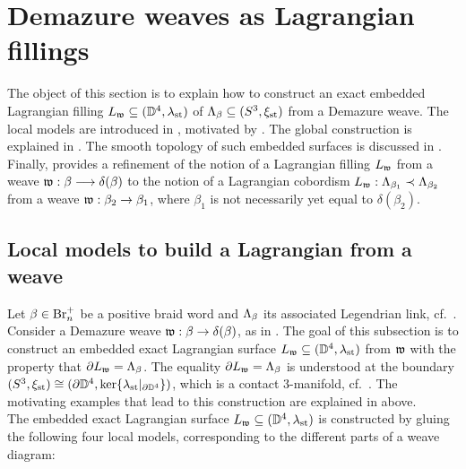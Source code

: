 \section{Demazure weaves as Lagrangian fillings}\label{sec:weaves_Lagrangian_fillings}

The object of this section is to explain how to construct an exact embedded Lagrangian filling $L_{\mathfrak{w}}\subseteq(\mathbb{D}^4,\lambda_{\text{st}})$ of $\Lambda_\beta\subseteq(S^3,\xi_{\text{st}})$ from a Demazure weave. The local models are introduced in , motivated by . The global construction is explained in . The smooth topology of such embedded surfaces is discussed in . Finally,  provides a refinement of the notion of a Lagrangian filling $L_{\mathfrak{w}}$ from a weave $\mathfrak{w}:\beta\longrightarrow\delta(\beta)$ to the notion of a Lagrangian cobordism $L_{\mathfrak{w}}:\Lambda_{\beta_1}\prec\Lambda_{\beta_2}$ from a weave $\mathfrak{w}:\beta_2\to\beta_1$, where $\beta_1$ is not necessarily yet equal to $\delta(\beta_2)$.

\subsection{Local models to build a Lagrangian from a weave}\label{ssec:Lagrangian_filling_from_weave_local_models} Let $\beta\in\mbox{Br}_n^+$ be a positive braid word and $\Lambda_\beta$ its associated Legendrian link, cf.~. Consider a Demazure weave $\mathfrak{w}:\beta\to\delta(\beta)$, as in . The goal of this subsection is to construct an embedded exact Lagrangian surface $L_{\mathfrak{w}}\subseteq(\mathbb{D}^4,\lambda_{\text{st}})$ from $\mathfrak{w}$ with the property that $\partial L_{\mathfrak{w}}=\Lambda_\beta$. The equality $\partial L_{\mathfrak{w}}=\Lambda_\beta$ is understood at the boundary $(S^3,\xi_{\text{st}})\cong (\partial \mathbb{D}^4,\ker\{\lambda_{\text{st}}|_{\partial \mathbb{D}^4}\})$, which is a contact 3-manifold, cf.~. The motivating examples that lead to this construction are explained in  above.\\

\noindent The embedded exact Lagrangian surface $L_{\mathfrak{w}}\subseteq(\mathbb{D}^4,\lambda_{\text{st}})$ is constructed by gluing the following four local models, corresponding to the different parts of a weave diagram:\\

